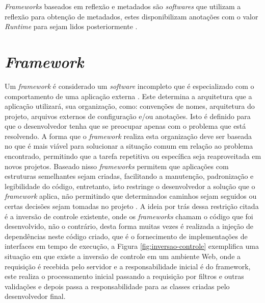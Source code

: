 \textit{Frameworks} baseados em reflexão e metadados são \textit{softwares} que utilizam a reflexão para obtenção de metadados, estes disponibilizam anotações com o valor \textit{Runtime} para sejam lidos posteriormente \cite{guerra2009pattern}.

\section{\textit{Framework}}

\par Um \textit{framework} é considerado um \textit{software} incompleto que é especializado com o comportamento de uma aplicação externa \cite{johnson1988designing}. Este determina a arquitetura que a aplicação utilizará, sua organização, como: convenções de nomes, arquitetura do projeto, arquivos externos de configuração e/ou anotações. Isto é definido para que o desenvolvedor tenha que se preocupar apenas com o problema que está resolvendo. A forma que o \textit{framework} realiza esta organização deve ser baseada no que é mais viável para solucionar a situação comum em relação ao problema encontrado, permitindo que a tarefa repetitiva ou específica seja reaproveitada em novos projetos.
Baseado nisso \textit{frameworks} permitem que aplicações com estruturas semelhantes sejam criadas, facilitando a manutenção, padronização e legibilidade do código, entretanto, isto restringe o desenvolvedor a solução que o \textit{framework} aplica, não permitindo que determinados caminhos sejam seguidos ou certas decisões sejam tomadas no projeto \cite{gamma2009padroes}. A ideia por trás dessa restrição citada é a inversão de controle existente, onde os \textit{frameworks} chamam o código que foi desenvolvido, não o contrário, desta forma muitas vezes é realizada a injeção de dependências neste código criado, que é o fornecimento de implementações de interfaces em tempo de execução, a Figura \ref{fig:inversao-controle} exemplifica uma situação em que existe a inversão de controle em um ambiente Web, onde a requisição é recebida pelo servidor e a responsabilidade inicial é do framework, este realiza o processamento inicial passando a requisição por filtros e outras validações e depois passa a responsabilidade para as classes criadas pelo desenvolvedor final.


